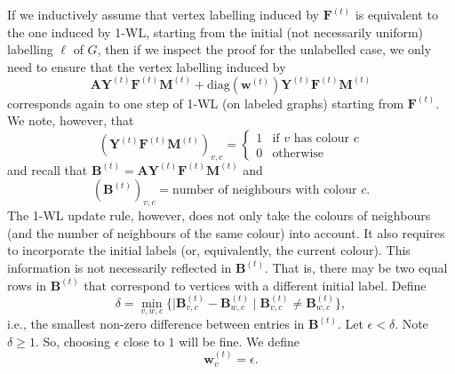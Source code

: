 If we inductively assume that vertex labelling induced by $\mathbf{F}^{(t)}$ is equivalent to the one induced by 1-WL, starting from the initial (not necessarily uniform) labelling $\ell$ of $G$, then if we inspect the proof for the unlabelled case, we only need to ensure that the vertex labelling induced by
\begin{equation}
\mathbf{A}\mathbf{Y}^{(t)}\mathbf{F}^{(t)}\mathbf{M}^{(t)} + \text{diag}(\mathbf{w}^{(t)})\mathbf{Y}^{(t)}\mathbf{F}^{(t)}\mathbf{M}^{(t)} \label{eq:labeled}
\end{equation}
corresponds again to one step of 1-WL (on labeled graphs) starting from $\mathbf{F}^{(t)}$. We note, however, that 
$$
(\mathbf{Y}^{(t)}\mathbf{F}^{(t)}\mathbf{M}^{(t)})_{v,c}=\begin{cases} 1 & \text{if $v$ has colour $c$}\\
0 &\text{otherwise}
\end{cases}
$$
and recall  that $\mathbf{B}^{(t)}=\mathbf{A}\mathbf{Y}^{(t)}\mathbf{F}^{(t)}\mathbf{M}^{(t)}$ and
$$
(\mathbf{B}^{(t)})_{v,c}=\text{number of neighbours with colour $c$}.
$$
The 1-WL update rule, however, does not only take the colours of neighbours (and the number of neighbours of the same colour) into account. It also requires
to incorporate the initial labels (or, equivalently, the current colour).  This information is not necessarily reflected in $\mathbf{B}^{(t)}$. That is, there may be two equal rows in $\mathbf{B}^{(t)}$ that correspond to vertices with a different
initial label. 
Define
$$
\delta=\min_{v,w,c}\{ | \mathbf{B}^{(t)}_{v,c}-\mathbf{B}^{(t)}_{w,c}\mid \mathbf{B}^{(t)}_{v,c}\neq \mathbf{B}^{(t)}_{w,c}\},
$$
i.e., the smallest non-zero difference between entries in $\mathbf{B}^{(t)}$.
Let $\epsilon<\delta$. Note $\delta\geq 1$. So, choosing $\epsilon$ close to $1$ will be fine.
We define
$$
\mathbf{w}^{(t)}_v=\epsilon.
$$
%
